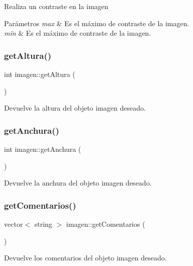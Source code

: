 Realiza un contraste en la imagen 
\begin{DoxyParams}{Parámetros}
{\em max} & Es el máximo de contraste de la imagen. \\
\hline
{\em min} & Es el máximo de contraste de la imagen. \\
\hline
\end{DoxyParams}
\mbox{\label{classimagen_aae8a3fc5fd7e983c8892b89e6d0473ea}} 
\subsubsection{\texorpdfstring{get\+Altura()}{getAltura()}}
{\footnotesize\ttfamily int imagen\+::get\+Altura (\begin{DoxyParamCaption}{ }\end{DoxyParamCaption})}

Devuelve la altura del objeto imagen deseado. \mbox{\label{classimagen_aacfbb6e3b502068e9d18d36f730c60d3}} 
\subsubsection{\texorpdfstring{get\+Anchura()}{getAnchura()}}
{\footnotesize\ttfamily int imagen\+::get\+Anchura (\begin{DoxyParamCaption}{ }\end{DoxyParamCaption})}

Devuelve la anchura del objeto imagen deseado. \mbox{\label{classimagen_ac4d0f4eb1e005e05ff6df48ad5f8b18d}} 
\subsubsection{\texorpdfstring{get\+Comentarios()}{getComentarios()}}
{\footnotesize\ttfamily vector$<$ string $>$ imagen\+::get\+Comentarios (\begin{DoxyParamCaption}{ }\end{DoxyParamCaption})}

Devuelve los comentarios del objeto imagen deseado. \mbox{\label{classimagen_ab8ddad8f0c6d8c8c66d9f773e2c0e98b}} 
